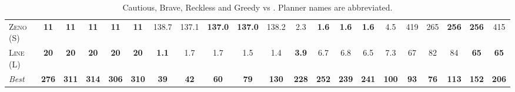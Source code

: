\documentclass[11pt,landscape]{article}
\begin{document}
\begin{table}[tb]
{\begin{tabular}{|l||ccccc||ccccc||ccccc||ccccc||}
\textsc{Zeno} (S)&\textbf{11}&\textbf{11}&\textbf{11}&\textbf{11}&\textbf{11}&138.7&137.1&\textbf{137.0}&\textbf{137.0}&138.2&2.3&\textbf{1.6}&\textbf{1.6}&\textbf{1.6}&4.5&419&265&\textbf{256}&\textbf{256}&415\\
\textsc{Line} (L)&\textbf{20}&\textbf{20}&\textbf{20}&\textbf{20}&\textbf{20}&\textbf{1.1}&1.7&1.7&1.5&1.4&\textbf{3.9}&6.7&6.8&6.5&7.3&67&82&84&\textbf{65}&\textbf{65}
\\\hline
\textit{Best}&\textbf{276}&\textbf{311}&\textbf{314}&\textbf{306}&\textbf{310}&\textbf{39}&\textbf{42}&\textbf{60}&\textbf{79}&\textbf{130}&\textbf{228}&\textbf{252}&\textbf{239}&\textbf{241}&\textbf{100}&\textbf{93}&\textbf{76}&\textbf{113}&\textbf{152}&\textbf{206}\\\hline

        \end{tabular}}
        \caption{Cautious, Brave, Reckless and Greedy \pattyd vs \pattyo. Planner names are abbreviated.}
        \label{tab:cbrg}
        \end{table}
        
\end{document}
